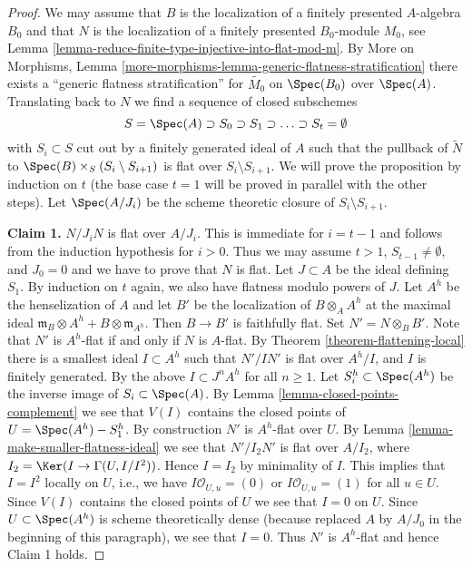 \begin{proof}
We may assume that $B$ is the localization of a finitely presented
$A$-algebra $B_0$ and that $N$ is the localization of a
finitely presented $B_0$-module $M_0$, see
Lemma \ref{lemma-reduce-finite-type-injective-into-flat-mod-m}.
By More on Morphisms, Lemma
\ref{more-morphisms-lemma-generic-flatness-stratification}
there exists a ``generic flatness stratification''
for $\widetilde{M_0}$ on $\Spec(B_0)$ over $\Spec(A)$.
Translating back to $N$ we find a sequence of closed subschemes
$$
S = \Spec(A) \supset S_0 \supset S_1 \supset \ldots \supset S_t = \emptyset
$$
with $S_i \subset S$ cut out by a finitely generated ideal of $A$
such that the pullback of $\widetilde{N}$ to
$\Spec(B) \times_S (S_i \setminus S_{i + 1})$ is flat over
$S_i \setminus S_{i + 1}$. We will prove the proposition by
induction on $t$ (the base case $t = 1$ will be proved in parallel
with the other steps). Let $\Spec(A/J_i)$ be the scheme theoretic
closure of $S_i \setminus S_{i + 1}$.

\medskip\noindent
{\bf Claim 1.} $N/J_iN$ is flat over $A/J_i$. This is immediate for
$i = t - 1$ and follows from the induction hypothesis for $i > 0$.
Thus we may assume $t > 1$, $S_{t - 1} \not = \emptyset$, and
$J_0 = 0$ and we have to prove that $N$ is flat. Let $J \subset A$
be the ideal defining $S_1$. By induction on $t$ again, we also
have flatness modulo powers of $J$. Let $A^h$ be the henselization of $A$
and let $B'$ be the localization of $B \otimes_A A^h$ at the maximal ideal
$\mathfrak m_B \otimes A^h + B \otimes \mathfrak m_{A^h}$. Then $B \to B'$
is faithfully flat. Set $N' = N \otimes_B B'$. Note that $N'$
is $A^h$-flat if and only if $N$ is $A$-flat. By
Theorem \ref{theorem-flattening-local} there is a smallest ideal
$I \subset A^h$ such that $N'/IN'$ is flat over $A^h/I$, and
$I$ is finitely generated. By the above $I \subset J^nA^h$ for
all $n \geq 1$. Let $S_i^h \subset \Spec(A^h)$ be the inverse image
of $S_i \subset \Spec(A)$. By Lemma \ref{lemma-closed-points-complement}
we see that $V(I)$ contains the closed points of $U = \Spec(A^h) - S_1^h$.
By construction $N'$ is $A^h$-flat over $U$.
By Lemma \ref{lemma-make-smaller-flatness-ideal} we see that $N'/I_2N'$
is flat over $A/I_2$, where
$I_2 = \Ker(I \to \Gamma(U, I/I^2))$. Hence $I = I_2$ by minimality
of $I$. This implies that $I = I^2$ locally on $U$, i.e.,
we have $I\mathcal{O}_{U, u} = (0)$ or $I\mathcal{O}_{U, u} = (1)$
for all $u \in U$. Since $V(I)$ contains the closed points of $U$
we see that $I = 0$ on $U$. Since $U \subset \Spec(A^h)$ is scheme
theoretically dense (because replaced $A$ by $A/J_0$ in the beginning
of this paragraph), we see that $I = 0$. Thus $N'$ is $A^h$-flat
and hence Claim 1 holds.


\end{proof}
